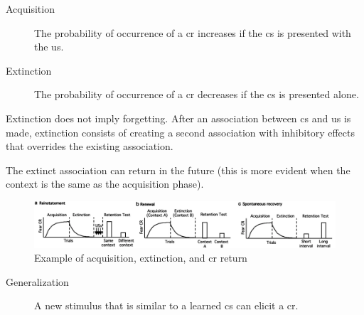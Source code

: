 \begin{description}
    \item[Acquisition] 
        The probability of occurrence of a \acl{cr} increases if the \acl{cs} is presented with the \acl{us}.
        
    \item[Extinction] 
        The probability of occurrence of a \acl{cr} decreases if the \acl{cs} is presented alone.
\end{description}

\begin{remark}
    Extinction does not imply forgetting.
    After an association between \ac{cs} and \ac{us} is made, 
    extinction consists of creating a second association with inhibitory effects that overrides the existing association.

    The extinct association can return in the future
    (this is more evident when the context is the same as the acquisition phase).
\end{remark}

\begin{figure}[H]
    \centering
    \includegraphics[width=0.95\linewidth]{./img/pavlovian_extinction.png}
    \caption{Example of acquisition, extinction, and \ac{cr} return}
\end{figure}

\begin{description}
    \item[Generalization]  
        A new stimulus that is similar to a learned \acl{cs} can elicit a \acl{cr}.
\end{description}

